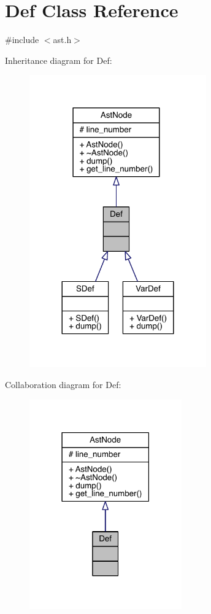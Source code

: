 \hypertarget{class_def}{}\section{Def Class Reference}
\label{class_def}


{\ttfamily \#include $<$ast.\+h$>$}



Inheritance diagram for Def\+:\nopagebreak
\begin{figure}[H]
\begin{center}
\leavevmode
\includegraphics[width=216pt]{class_def__inherit__graph}
\end{center}
\end{figure}


Collaboration diagram for Def\+:\nopagebreak
\begin{figure}[H]
\begin{center}
\leavevmode
\includegraphics[width=186pt]{class_def__coll__graph}
\end{center}
\end{figure}
